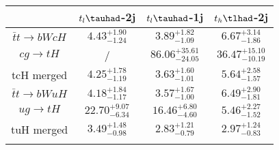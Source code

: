 \centering
\begin{tabular}{cccc} \toprule\toprule
 & $t_l\tauhad$-2j & $t_l\tauhad$-1j & $t_h\tlhad$-2j\\\midrule
$\bar{t}t\to bWcH$ & $4.43^{+1.90}_{-1.24}$ & $3.89^{+1.82}_{-1.09}$ & $6.67^{+3.14}_{-1.86}$\\
$cg\to tH$ &  / & $86.06^{+35.61}_{-24.05}$ & $36.47^{+15.10}_{-10.19}$\\
tcH merged & $4.25^{+1.78}_{-1.19}$ & $3.63^{+1.60}_{-1.01}$ & $5.64^{+2.58}_{-1.57}$\\
$\bar{t}t\to bWuH$ & $4.18^{+1.84}_{-1.17}$ & $3.57^{+1.67}_{-1.00}$ & $6.49^{+2.90}_{-1.81}$\\
$ug\to tH$ & $22.70^{+9.07}_{-6.34}$ & $16.46^{+6.80}_{-4.60}$ & $5.46^{+2.27}_{-1.52}$\\
tuH merged & $3.49^{+1.48}_{-0.98}$ & $2.83^{+1.21}_{-0.79}$ & $2.97^{+1.24}_{-0.83}$\\
\bottomrule\bottomrule\\
\end{tabular}
